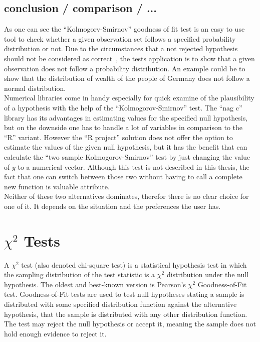 \documentclass{article}
\begin{document}
\subsection{conclusion / comparison / ...}
As one can see the ``Kolmogorv-Smirnov'' goodness of fit test is an easy to use tool to check whether a given observation set follows a specified probability distribution or not.
Due to the circumstances that a not rejected hypothesis should not be considered as correct~\cite{conover1980practical}, the tests application is to show that a given observation does not follow a probability distribution. An example could be to show that the distribution of wealth of the people of Germany does not follow a normal distribution.\\
Numerical libraries come in handy especially for quick examine of the plausibility of a hypothesis with the help of the ``Kolmogorov-Smirnov'' test. The ``nag c'' library has its advantages 
in estimating values for the specified null hypothesis, but on the downside one has to handle a lot of variables in comparison to the ``R'' variant. However the ``R project'' solution does not offer the option to estimate the values of the given null hypothesis, but it has the benefit that can calculate the ``two sample Kolmogorov-Smirnov'' test by just changing the value of $y$ to a numerical vector. Although this test is not described in this thesis, the fact that one can switch between those two without having to call a complete new function is valuable attribute.\\
Neither of these two alternatives dominates, therefor there is no clear choice for one of it. It depends on the situation and the preferences the user has. 
\section{$\chi^2$ Tests}
A $\chi^2$ test (also denoted chi-square test) is a statistical hypothesis test in which the sampling distribution of the test statistic is a $\chi^2$ distribution under the null hypothesis.
The oldest and best-known version is Pearson's $\chi^2$ Goodness-of-Fit test.
Goodness-of-Fit tests are used to test null hypotheses stating a sample is distributed with some specified distribution function against the alternative hypothesis, that the sample is distributed with any other distribution function.
The test may reject the null hypothesis or accept it, meaning the sample does not hold enough evidence to reject it.
\end{document}
